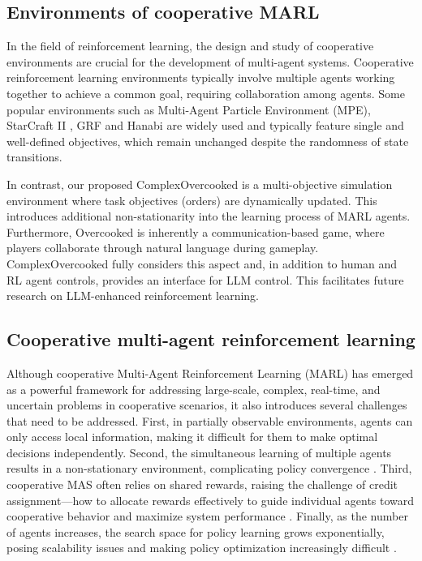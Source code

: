 \subsection{Environments of cooperative MARL}
In the field of reinforcement learning, the design and study of cooperative environments are crucial for the development of multi-agent systems. Cooperative reinforcement learning environments typically involve multiple agents working together to achieve a common goal, requiring collaboration among agents. Some popular environments such as Multi-Agent Particle Environment (MPE)\cite{lowe2017multi}, StarCraft II \cite{vinyals2017starcraft}, GRF\cite{kurach2020google} and Hanabi\cite{bard2020hanabi} are widely used and typically feature single and well-defined objectives, which remain unchanged despite the randomness of state transitions. 

In contrast, our proposed ComplexOvercooked is a multi-objective simulation environment where task objectives (orders) are dynamically updated. This introduces additional non-stationarity into the learning process of MARL agents. Furthermore, Overcooked is inherently a communication-based game, where players collaborate through natural language during gameplay. ComplexOvercooked fully considers this aspect and, in addition to human and RL agent controls, provides an interface for LLM control. This facilitates future research on LLM-enhanced reinforcement learning.
\subsection{Cooperative multi-agent reinforcement learning}
Although cooperative Multi-Agent Reinforcement Learning (MARL) has emerged as a powerful framework for addressing large-scale, complex, real-time, and uncertain problems in cooperative scenarios, it also introduces several challenges that need to be addressed. First, in partially observable environments, agents can only access local information, making it difficult for them to make optimal decisions independently\cite{zhu2022survey}. Second, the simultaneous learning of multiple agents results in a non-stationary environment, complicating policy convergence \cite{papoudakis2019dealing}. Third, cooperative MAS often relies on shared rewards, raising the challenge of credit assignment—how to allocate rewards effectively to guide individual agents toward cooperative behavior and maximize system performance \cite{wang2021towards}. Finally, as the number of agents increases, the search space for policy learning grows exponentially, posing scalability issues and making policy optimization increasingly difficult \cite{zhang2011scaling,christianos2021scaling}.

